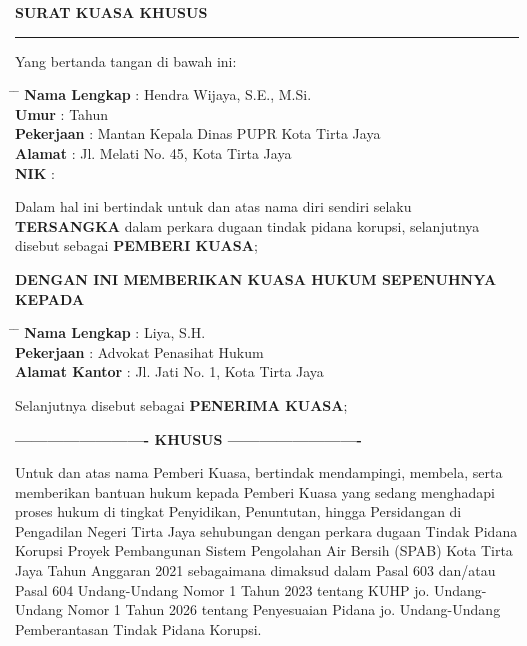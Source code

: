 \documentclass{article}
\begin{document}
\begin{center}
    {\large \textbf{ SURAT KUASA KHUSUS }} \\[0.5em]
    \rule{8cm}{0.4pt}
\end{center}

Yang bertanda tangan di bawah ini:
\begin{tabbing}
    \hspace{3cm} \= \hspace{1cm} \= \kill
    \textbf{Nama Lengkap} \> : \> Hendra Wijaya, S.E., M.Si. \\
    \textbf{Umur} \> :  Tahun \\
    \textbf{Pekerjaan} \> : \> Mantan Kepala Dinas PUPR Kota Tirta Jaya \\
    \textbf{Alamat} \> : \> Jl. Melati No. 45, Kota Tirta Jaya \\
    \textbf{NIK} \> : 
\end{tabbing}

Dalam hal ini bertindak untuk dan atas nama diri sendiri selaku \textbf{TERSANGKA} dalam perkara dugaan tindak pidana korupsi, selanjutnya disebut sebagai \textbf{PEMBERI KUASA};

\vspace{0.8em}
\begin{center}
    \textbf{DENGAN INI MEMBERIKAN KUASA HUKUM SEPENUHNYA KEPADA}
\end{center}
\vspace{0.3em}

\begin{tabbing}
    \hspace{3cm} \= \hspace{1cm} \= \kill
    \textbf{Nama Lengkap} \> : \> Liya, S.H. \\
    \textbf{Pekerjaan} \> : \> Advokat Penasihat Hukum \\
    \textbf{Alamat Kantor} \> : \> Jl. Jati No. 1, Kota Tirta Jaya \\
\end{tabbing}

Selanjutnya disebut sebagai \textbf{PENERIMA KUASA};

\vspace{0.8em}
\begin{center}
    \textbf{------------------------- KHUSUS -------------------------}
\end{center}
\vspace{0.3em}

Untuk dan atas nama Pemberi Kuasa, bertindak mendampingi, membela, serta memberikan bantuan hukum kepada Pemberi Kuasa yang sedang menghadapi proses hukum di tingkat Penyidikan, Penuntutan, hingga Persidangan di Pengadilan Negeri Tirta Jaya sehubungan dengan perkara dugaan Tindak Pidana Korupsi Proyek Pembangunan Sistem Pengolahan Air Bersih (SPAB) Kota Tirta Jaya Tahun Anggaran 2021 sebagaimana dimaksud dalam Pasal 603 dan/atau Pasal 604 Undang-Undang Nomor 1 Tahun 2023 tentang KUHP jo. Undang-Undang Nomor 1 Tahun 2026 tentang Penyesuaian Pidana jo. Undang-Undang Pemberantasan Tindak Pidana Korupsi.
\end{document}
